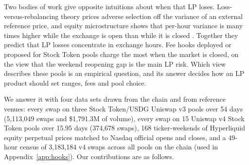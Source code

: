 \documentclass[11pt]{article}
\newcommand{\USD}{\$}
\begin{document}
Two bodies of work give opposite intuitions about when that LP loses. Loss-versus-rebalancing theory \citep{milionis2022lvr} prices adverse selection off the variance of an external reference price, and equity microstructure shows that per-hour variance is many times higher while the exchange is open than while it is closed \citep{french1986variances}. Together they predict that LP losses concentrate in exchange hours. Fee hooks deployed or proposed for Stock Token pools charge the most when the market is closed, on the view that the weekend reopening gap is the main LP risk. Which view describes these pools is an empirical question, and its answer decides how an LP product should set ranges, fees and pool choice.

We answer it with four data sets drawn from the chain and from reference venues: every swap on three Stock Token/USDG Uniswap v3 pools over 54 days (5,113,049 swaps and \USD1,791.3M of volume), every swap on 15 Uniswap v4 Stock Token pools over 15.95 days (374,678 swaps), 168 ticker-weekends of Hyperliquid equity perpetual prices matched to Nasdaq official opens and closes, and a 49-hour census of 3,183,184 v4 swaps across all pools on the chain (used in Appendix~\ref{app:hooks}). Our contributions are as follows.
\end{document}
